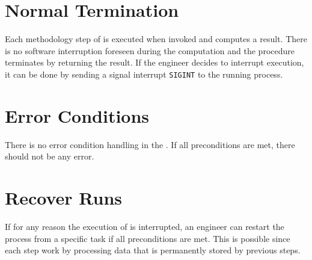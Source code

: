 

\section{Normal Termination}


Each methodology step of \MASS is executed when invoked and computes a result. There is no software interruption foreseen during the computation and the procedure terminates by returning the result.
If the engineer decides to interrupt \MASS execution, it can be done by sending a signal interrupt \texttt{SIGINT} to the running process.

\section{Error Conditions}


There is no error condition handling in the \FAQAS. If all preconditions are met, there should not be any error.

\section{Recover Runs}


If for any reason the execution of \MASS is interrupted, an engineer can restart the process from a specific task if all preconditions are met. This is possible since each \MASS step work by processing data that is permanently stored by previous steps.


